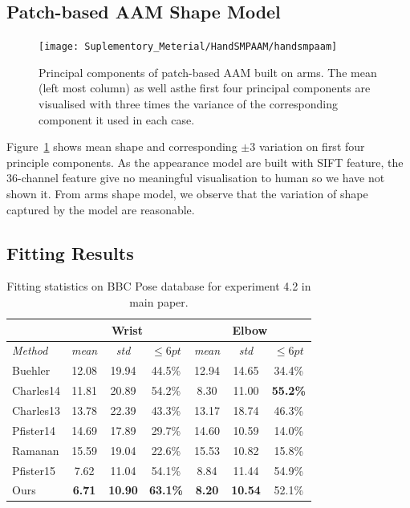 \subsection{Patch-based AAM Shape Model}
\label{sec:paam_sm}

\begin{figure}[!b]
\centering
\texttt{[image: Suplementory\_Meterial/HandSMPAAM/handsmpaam]}
\caption{Principal components of patch-based AAM built on arms.  The mean (left most column) as well asthe first four principal components are visualised with three times the variance of the corresponding component it used in each case.}
\label{fig:paam_sm}
\end{figure}

Figure~\ref{fig:paam_sm} shows mean shape and corresponding $\pm 3$ variation on first four principle components. As the appearance model are built with SIFT feature, the 36-channel feature give no meaningful visualisation to human so we have not shown it. From arms shape model, we observe that the variation of shape captured by the model are reasonable.

\subsection{Fitting Results}
\label{sec:paam_fittingresults}

\begin{table}[t!]
    \small
    \centering
    \begin{tabular}{|l|c|c|c||c|c|c|}
        \hline
                            & \multicolumn{3}{c||}{Wrist} & \multicolumn{3}{c|}{Elbow}\\
        \hline
        \emph{Method}       & \emph{mean} & \emph{std} & $\leq 6pt$ & \emph{mean} & \emph{std} & $\leq 6pt$\\
        \hline\hline
        Buehler             & 12.08    & 19.94        & 44.5\%       & 12.94    & 14.65        & 34.4\%\\
        Charles14           & 11.81    & 20.89        & 54.2\%       &  8.30    & 11.00        & \textbf{55.2\%}\\
        Charles13           & 13.78    & 22.39        & 43.3\%       & 13.17    & 18.74        & 46.3\%\\
        Pfister14           & 14.69    & 17.89        & 29.7\%       & 14.60    & 10.59        & 14.0\%\\
        Ramanan             & 15.59    & 19.04        & 22.6\%       & 15.53    & 10.82        & 15.8\%\\
        Pfister15           & 7.62     & 11.04        & 54.1\%       &  8.84    & 11.44        & 54.9\%\\
        \hline\hline
        Ours                & \textbf{6.71}& \textbf{10.90}   & \textbf{63.1\%}       & \textbf{8.20}     &  \textbf{10.54}        & 52.1\%\\
        \hline
    \end{tabular}
    \caption{Fitting statistics on BBC Pose database for experiment 4.2 in main paper.}
    \label{tab:hand_benchmark}
\end{table}
    
